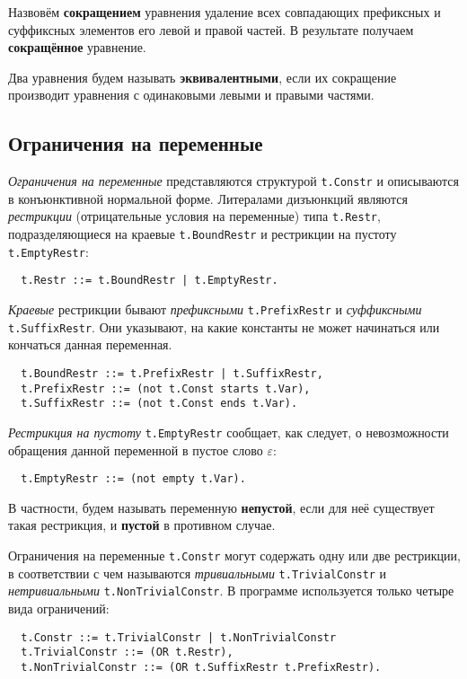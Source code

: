 \documentclass[12pt]{article}
\begin{document}
Назвовём \textbf{сокращением} уравнения удаление всех совпадающих префиксных
и суффиксных элементов его левой и правой частей. В результате получаем
\textbf{сокращённое} уравнение.

Два уравнения будем называть \textbf{эквивалентными}, если их сокращение
производит уравнения с одинаковыми левыми и правыми частями.

\subsection{Ограничения на переменные}

\textit{Ограничения на переменные} представляются структурой \texttt{t.Constr}
и описываются в конъюнктивной нормальной форме. Литералами дизъюнкций являются
\textit{рестрикции} (отрицательные условия на переменные) типа \texttt{t.Restr},
подразделяющиеся на краевые \texttt{t.BoundRestr} и рестрикции на пустоту
\texttt{t.EmptyRestr}:
\begin{Verbatim}
  t.Restr ::= t.BoundRestr | t.EmptyRestr.
\end{Verbatim}

\textit{Краевые} рестрикции бывают \textit{префиксными} \texttt{t.PrefixRestr} и
\textit{суффиксными} \texttt{t.SuffixRestr}. Они указывают, на какие константы
не может начинаться или кончаться данная переменная.
\begin{Verbatim}
  t.BoundRestr ::= t.PrefixRestr | t.SuffixRestr,
  t.PrefixRestr ::= (not t.Const starts t.Var),
  t.SuffixRestr ::= (not t.Const ends t.Var).
\end{Verbatim}

\textit{Рестрикция на пустоту} \texttt{t.EmptyRestr} сообщает, как следует, о
невозможности обращения данной переменной в пустое слово $\varepsilon$:
\begin{Verbatim}
  t.EmptyRestr ::= (not empty t.Var).
\end{Verbatim}

В частности, будем называть переменную \textbf{непустой}, если для неё
существует такая рестрикция, и \textbf{пустой} в противном случае.

Ограничения на переменные \texttt{t.Constr} могут содержать одну или две
рестрикции, в соответствии с чем называются \textit{тривиальными}
\texttt{t.TrivialConstr} и \textit{нетривиальными} \texttt{t.NonTrivialConstr}.
В программе используется только четыре вида ограничений:
\begin{Verbatim}
  t.Constr ::= t.TrivialConstr | t.NonTrivialConstr
  t.TrivialConstr ::= (OR t.Restr),
  t.NonTrivialConstr ::= (OR t.SuffixRestr t.PrefixRestr).
\end{Verbatim}
\end{document}
